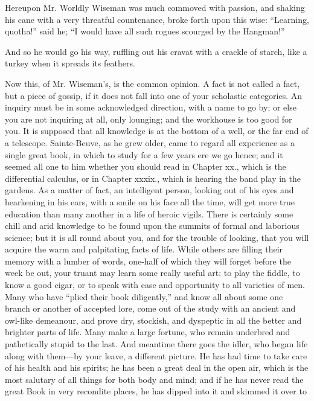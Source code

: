 Hereupon Mr. Worldly Wiseman was much commoved with passion, and
shaking his cane with a very threatful countenance, broke forth upon
this wise: ``Learning, quotha!'' said he; ``I would have all such
rogues scourged by the Hangman!''

And so he would go his way, ruffling out  his cravat with a
crackle of starch, like a turkey when it spreads its feathers.

Now this, of Mr. Wiseman's, is the common opinion. A fact is not
called a fact, but a piece of gossip, if it does not fall into one of
your scholastic categories. An inquiry must be in some acknowledged
direction, with a name to go by; or else you are not inquiring at all,
only lounging; and the workhouse is too good for you. It is supposed
that all knowledge is at the bottom of a well, or the far end of a
telescope. Sainte-Beuve, as he grew older, came to regard all
experience as a single great book, in which to study for a few years
ere we go hence; and it seemed all one to him whether you should read
in Chapter xx., which is the differential calculus, or in Chapter
xxxix., which is hearing the band play in the gardens. As a matter of
fact, an intelligent person, looking out of his eyes and hearkening in
his ears, with a smile on his face all the time, will get more true
education than many another in a life of heroic vigils. 
There is certainly some chill and arid knowledge to be found upon the
summits of formal and laborious science; but it is all round about
you, and for the trouble of looking, that you will acquire the warm
and palpitating facts of life. While others are filling their memory
with a lumber of words, one-half of which they will forget before the
week be out, your truant may learn some really useful art: to play the
fiddle, to know a good cigar, or to speak with ease and opportunity to
all varieties of men. Many who have ``plied their book diligently,''
and know all about some one branch or another of accepted lore, come
out of the study with an ancient and owl-like demeanour, and prove
dry, stockish, and dyspeptic in all the better and brighter parts of
life. Many make a large fortune, who remain underbred and pathetically
stupid to the last. And meantime there goes the idler, who began life
along with them---by your leave, a different picture. He has had time
to take care of his health and his spirits; he  has been a
great deal in the open air, which is the most salutary of all things
for both body and mind; and if he has never read the great Book in
very recondite places, he has dipped into it and skimmed it over to
